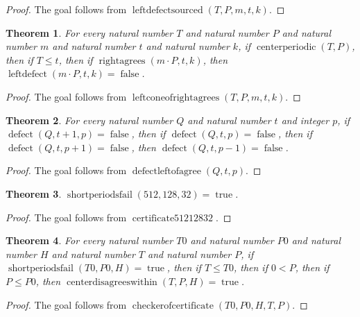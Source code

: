 \documentclass[11pt]{article}
\newtheorem{theorem}{Theorem}[section]
\theoremstyle{definition}
\begin{document}
\begin{proof}
The goal follows from \(\operatorname{leftdefectsourced}(T, P, m, t, k)\).
\end{proof}
\begin{theorem}
\label{ll:observations:left-cone-of-right-agrees}
For every natural number \(T\) and natural number \(P\) and natural number \(m\) and natural number \(t\) and natural number \(k\), if \(\operatorname{centerperiodic}(T, P)\), then if \(T \le t\), then if \(\operatorname{rightagrees}(m \cdot P, t, k)\), then \(\operatorname{leftdefect}(m \cdot P, t, k) = \operatorname{false}\).
\end{theorem}
\begin{proof}
The goal follows from \(\operatorname{leftconeofrightagrees}(T, P, m, t, k)\).
\end{proof}
\begin{theorem}
\label{ll:observations:defect-left-of-agree}
For every natural number \(Q\) and natural number \(t\) and integer \(p\), if \(\operatorname{defect}(Q, t + 1, p) = \operatorname{false}\), then if \(\operatorname{defect}(Q, t, p) = \operatorname{false}\), then if \(\operatorname{defect}(Q, t, p + 1) = \operatorname{false}\), then \(\operatorname{defect}(Q, t, p - 1) = \operatorname{false}\).
\end{theorem}
\begin{proof}
The goal follows from \(\operatorname{defectleftofagree}(Q, t, p)\).
\end{proof}
\begin{theorem}
\label{ll:observations:certificate-512-128-32}
\(\operatorname{shortperiodsfail}(512, 128, 32) = \operatorname{true}\).
\end{theorem}
\begin{proof}
The goal follows from \(\operatorname{certificate51212832}\).
\end{proof}
\begin{theorem}
\label{ll:observations:checker-of-certificate}
For every natural number \(T0\) and natural number \(P0\) and natural number \(H\) and natural number \(T\) and natural number \(P\), if \(\operatorname{shortperiodsfail}(T0, P0, H) = \operatorname{true}\), then if \(T \le T0\), then if \(0 < P\), then if \(P \le P0\), then \(\operatorname{centerdisagreeswithin}(T, P, H) = \operatorname{true}\).
\end{theorem}
\begin{proof}
The goal follows from \(\operatorname{checkerofcertificate}(T0, P0, H, T, P)\).
\end{proof}
\end{document}
